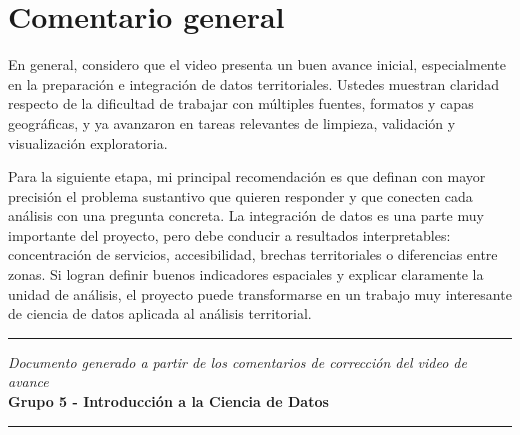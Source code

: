 \documentclass[11pt]{article}
\begin{document}
\vspace{0.5cm}

\section*{Comentario general}

En general, considero que el video presenta un buen avance inicial, especialmente en la preparación e integración de datos territoriales. Ustedes muestran claridad respecto de la dificultad de trabajar con múltiples fuentes, formatos y capas geográficas, y ya avanzaron en tareas relevantes de limpieza, validación y visualización exploratoria.

Para la siguiente etapa, mi principal recomendación es que definan con mayor precisión el problema sustantivo que quieren responder y que conecten cada análisis con una pregunta concreta. La integración de datos es una parte muy importante del proyecto, pero debe conducir a resultados interpretables: concentración de servicios, accesibilidad, brechas territoriales o diferencias entre zonas. Si logran definir buenos indicadores espaciales y explicar claramente la unidad de análisis, el proyecto puede transformarse en un trabajo muy interesante de ciencia de datos aplicada al análisis territorial.

\vspace{0.5cm}

\begin{center}
\hrule
\vspace{0.3cm}
\small \textit{Documento generado a partir de los comentarios de corrección del video de avance}
\vspace{0.2cm}
\\
\small \textbf{Grupo 5 - Introducción a la Ciencia de Datos}
\hrule
\end{center}
\end{document}
